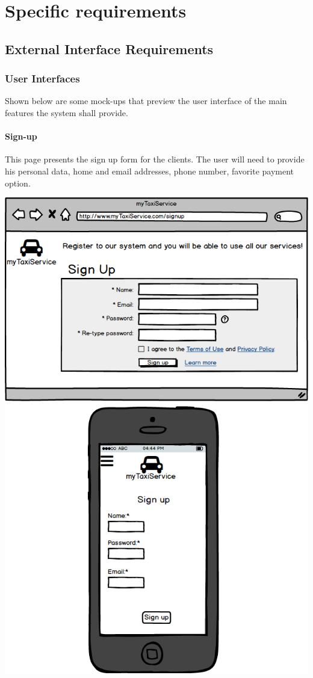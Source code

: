 \documentclass[a4paper,11pt]{report} %
\begin{document}
	
	\section{Specific requirements}
	
	\subsection{External Interface Requirements} 
	
	\subsubsection{User Interfaces} Shown below are some mock-ups that preview the user interface of the main features the system shall provide.
	
	\pagebreak
	\paragraph{Sign-up} This page presents the sign up form for the clients. The user will need to provide his personal data, home and email addresses, phone number, favorite payment option.
	\begin{center}
		\includegraphics[width=0.9\linewidth]{Pictures/Signup}
	\end{center}
	\pagebreak
	
\end{document}
